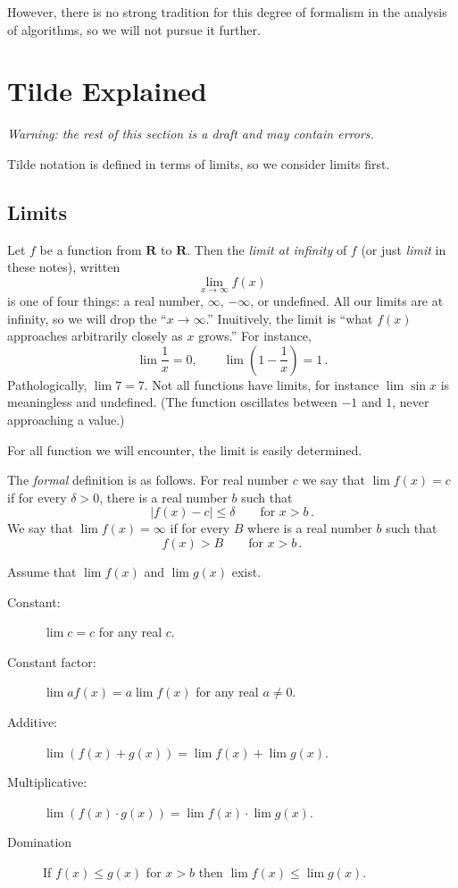 \documentclass{tstextbook}
\begin{document}
However, there is no strong tradition for this degree of formalism in the analysis of algorithms, so we will not pursue it further.


\chapter{Tilde Explained}

\emph{Warning: the rest of this section is a draft and may contain errors.}

Tilde notation is defined in terms of limits, so we consider limits first.

\section{Limits}

Let $f$ be a function from $\mathbf R$ to $\mathbf R$.
Then the \emph{limit at infinity} of $f$ (or just \emph{limit} in these notes), written
\[ \lim_{x\rightarrow \infty} f(x)\]
is one of four things: a real number, $\infty$, $-\infty$, or undefined.
All our limits are at infinity, so we will drop the ``$x\rightarrow \infty$.''
Inuitively, the limit is ``what $f(x)$ approaches arbitrarily closely as $x$ grows.'' 
For instance,
\[ \lim \frac1x= 0, \qquad \lim\left( 1-\frac1x\right) = 1\,.\]
Pathologically, $\lim 7 =7$.
Not all functions have limits, for instance $\lim \sin x$ is meaningless and undefined.
(The function oscillates between $-1$ and $1$, never approaching a value.)

For all function we will encounter, the limit is easily determined.

The \emph{formal} definition is as follows.
For real number $c$ we say that $\lim f(x) =c$ if for every $\delta > 0$, there is a real number $b$ such that
\[ |f(x) - c|\leq \delta \qquad\text{for $x>b$}\,. \]
We say that $\lim f(x)= \infty$ if for every $B$ where is a real number $b$ such that \[f(x) > B\qquad\text{for $x>b$}\,.\]

\begin{theorem}
  Assume that $\lim f(x)$ and $\lim g(x)$ exist.
  \begin{description}
    \item[Constant:] $\lim c = c$ for any real $c$.
    \item[Constant factor:] $\lim a f(x) = a\lim f(x)$ for any real $a\neq 0$.
    \item[Additive:] $\lim (f(x) + g(x)) = \lim f(x) + \lim g(x)$.
    \item[Multiplicative:] $\lim (f(x) \cdot g(x)) = \lim f(x) \cdot \lim g(x)$.
    \item[Domination] If $f(x) \leq g(x)$  for $x> b$ then $\lim f(x) \leq \lim g(x)$.
  \end{description}
\end{theorem}
\end{document}
